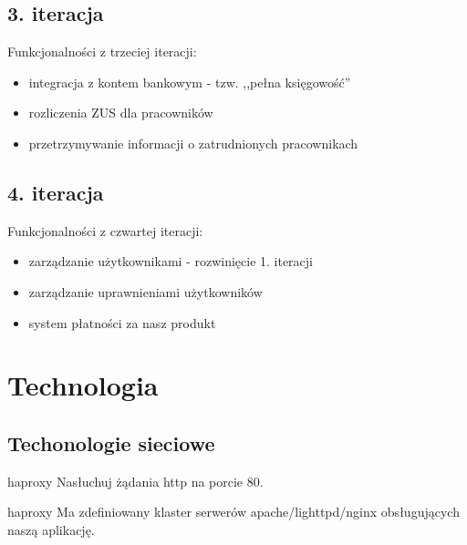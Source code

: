 \documentclass{beamer}
\begin{document}
\subsection{3. iteracja}
  \begin{frame}
      Funkcjonalności z trzeciej iteracji:
    \begin{itemize}
      \item integracja z kontem bankowym - tzw. ,,pełna księgowość'' 
      \item rozliczenia ZUS dla pracowników
      \item przetrzymywanie informacji o zatrudnionych pracownikach
    \end{itemize}
  \end{frame}
\subsection{4. iteracja}
  \begin{frame}
      Funkcjonalności z czwartej iteracji:
    \begin{itemize}
      \item zarządzanie użytkownikami - rozwinięcie 1. iteracji
      \item zarządzanie uprawnieniami użytkowników
      \item system płatności za nasz produkt
    \end{itemize}
  \end{frame}
\section{Technologia}
\subsection{Techonologie sieciowe}
  \begin{frame}
    \begin{block}{haproxy}
      Nasłuchuj żądania http na porcie 80.
    \end{block}
  \end{frame}
  \begin{frame}
    \begin{block}{haproxy}
      Ma zdefiniowany klaster serwerów apache/lighttpd/nginx obsługujących naszą aplikację.
    \end{block}
  \end{frame}
\end{document}
